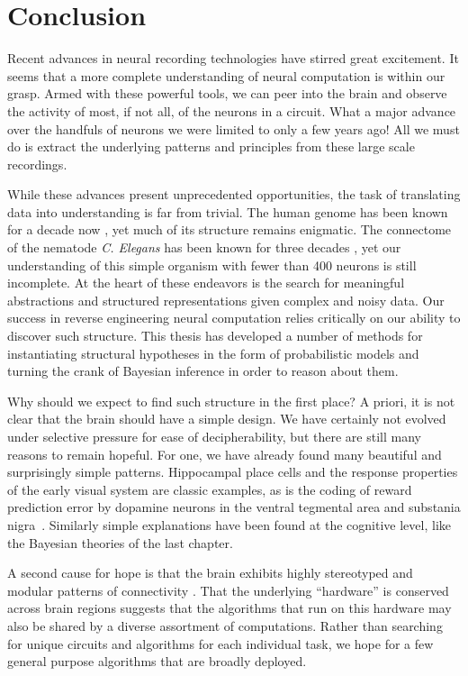 \chapter{Conclusion}
\label{conclusion}

Recent advances in neural recording technologies have stirred great
excitement. It seems that a more complete understanding of neural
computation is within our grasp. Armed with these powerful tools, we
can peer into the brain and observe the activity of most, if not all,
of the neurons in a circuit. What a major advance over the handfuls
of neurons we were limited to only a few years ago! All we must do
is extract the underlying patterns and principles from these
large scale recordings.

While these advances present unprecedented opportunities, the task of
translating data into understanding is far from trivial. The human
genome has been known for a decade now \citep{international2004finishing, gregory2006dna}, yet much of its structure
remains enigmatic. The connectome of the nematode \textit{C. Elegans}
has been known for three decades \citep{white1986structure}, yet our
understanding of this simple organism with fewer than 400 neurons is
still incomplete. At the heart of these endeavors is the search for
meaningful abstractions and structured representations given complex
and noisy data. Our success in reverse engineering neural computation
relies critically on our ability to discover such structure. This
thesis has developed a number of methods for instantiating structural
hypotheses in the form of probabilistic models and turning the crank
of Bayesian inference in order to reason about them.

Why should we expect to find such structure in the first place?  A
priori, it is not clear that the brain should have a simple design. We
have certainly not evolved under selective pressure for ease of
decipherability, but there are still many reasons to remain
hopeful. For one, we have already found many beautiful and
surprisingly simple patterns. Hippocampal place cells and the response
properties of the early visual system are classic examples, as is the
coding of reward prediction error by dopamine neurons in the ventral
tegmental area and substania
nigra~\citep{schultz1997neural}. Similarly simple explanations have
been found at the cognitive level, like the Bayesian theories of the
last chapter.

A second cause for hope is that the brain exhibits highly stereotyped and
modular patterns of connectivity \citep{shepherd2003synaptic}.  That
the underlying ``hardware'' is conserved across brain regions
suggests that the algorithms that run on this hardware may also be shared
by a diverse assortment of computations. Rather than searching for
unique circuits and algorithms for each individual task, we hope for
a few general purpose algorithms that are broadly deployed.

